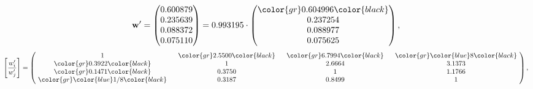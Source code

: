 \begin{example}
\begin{equation*}
\mathbf{w}^{\prime} =
\begin{pmatrix}
0.600879\\
0.235639\\
0.088372\\
0.075110
\end{pmatrix} =
0.993195\cdot
\begin{pmatrix}
\color{gr} 0.604996\color{black} \\
0.237254\\
0.088977\\
0.075625
\end{pmatrix},
\end{equation*}
\begin{equation*}
\left[ \frac{{w}^{\prime}_i}{{w}^{\prime}_j} \right] =
\begin{pmatrix}
$\,\,$ 1 $\,\,$ & $\,\,$\color{gr} 2.5500\color{black} $\,\,$ & $\,\,$\color{gr} 6.7994\color{black} $\,\,$ & $\,\,$\color{gr} \color{blue} 8\color{black} $\,\,$ \\
$\,\,$\color{gr} 0.3922\color{black} $\,\,$ & $\,\,$ 1 $\,\,$ & $\,\,$2.6664$\,\,$ & $\,\,$3.1373  $\,\,$ \\
$\,\,$\color{gr} 0.1471\color{black} $\,\,$ & $\,\,$0.3750$\,\,$ & $\,\,$ 1 $\,\,$ & $\,\,$1.1766 $\,\,$ \\
$\,\,$\color{gr} \color{blue}  1/8\color{black} $\,\,$ & $\,\,$0.3187$\,\,$ & $\,\,$0.8499$\,\,$ & $\,\,$ 1  $\,\,$ \\
\end{pmatrix},
\end{equation*}
\end{example}
\newpage
